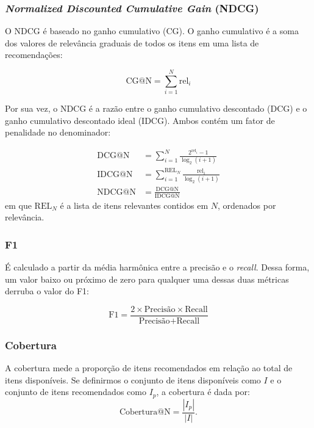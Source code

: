   \subsubsection{\textit{Normalized Discounted Cumulative Gain} (NDCG)}
  O NDCG é baseado no ganho cumulativo (CG). O ganho cumulativo é a soma dos
  valores de relevância graduais de todos os itens em uma lista de
  recomendações:

  \begin{equation}
    \text{CG@N} = \sum_{i = 1}^{N} \text{rel}_{i}
  \end{equation}
  
  Por sua vez, o NDCG é a razão entre o ganho cumulativo
  descontado (DCG) e o ganho cumulativo descontado ideal (IDCG). Ambos contém
  um fator de penalidade no denominador:

  \begin{align}
    \text{DCG@N} &= \sum_{i = 1}^{N} \frac{2^{\text{rel}_{i}} - 1}{\log_{2}(i + 1)} \\
    \text{IDCG@N} &= \sum_{i = 1}^{\text{REL}_N} \frac{\text{rel}_{i}}{{\log_{2}(i + 1)}} \\
    \text{NDCG@N} &= \frac{\text{DCG@N}}{\text{IDCG@N}}
  \end{align}
  em que $\text{REL}_N$ é a lista de itens relevantes contidos em $N$, ordenados
  por relevância.


  \subsubsection{F1}
É calculado a partir da média harmônica entre a precisão e o \textit{recall}. Dessa forma,
um valor baixo ou próximo de zero para qualquer uma dessas duas métricas derruba
o valor do F1:

\begin{equation}
  \text{F1} = \frac{2 \times \text{Precisão} \times \text{Recall}}{\text{Precisão} + \text{Recall}}
\end{equation}

  \subsubsection{Cobertura}
  A cobertura mede a proporção de itens recomendados em relação ao total de
  itens disponíveis. Se definirmos o conjunto de itens disponíveis como $I$ e o
  conjunto de itens recomendados como $I_{p}$, a cobertura é dada por:
  \begin{equation}
    \text{Cobertura@N} = \frac{|I_{p}|}{|I|}.
  \end{equation}

